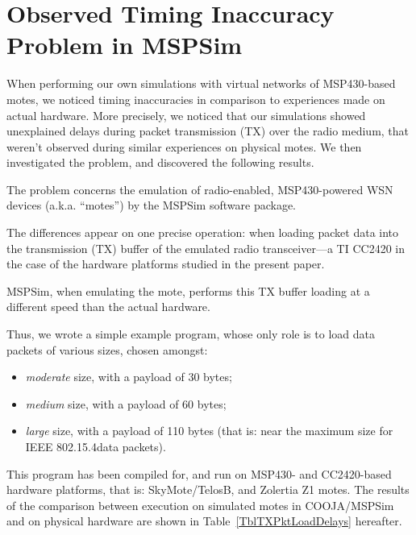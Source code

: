 \documentclass[a4paper,10pt]{article}
\begin{document}

\section{Observed Timing Inaccuracy Problem in MSPSim}
\label{results}

When performing our own simulations with virtual networks of MSP430-based
motes, we noticed timing inaccuracies in comparison to experiences made
on actual hardware. More precisely, we noticed that our simulations showed
unexplained delays during packet transmission (TX) over the radio medium,
that weren't observed during similar experiences on physical motes.
We then investigated the problem, and discovered the following results.

The problem concerns the emulation of radio-enabled, MSP430-powered WSN
devices (a.k.a. ``motes'') by the MSPSim software package.

The differences appear on one precise operation: when loading packet data
into the transmission (TX) buffer of the emulated radio transceiver---a TI
CC2420 in the case of the hardware platforms studied in the present paper.

MSPSim, when emulating the mote, performs this TX buffer loading at
a different speed than the actual hardware.

Thus, we wrote a simple example program, whose only role is to load data
packets of various sizes, chosen amongst:
\begin{itemize}
\item \emph{moderate} size, with a payload of 30 bytes;
\item \emph{medium} size, with a payload of 60 bytes;
\item \emph{large} size, with a payload of 110 bytes (that is:
      near the maximum size for IEEE 802.15.4\footnotemark[1] data packets).
\end{itemize}
This program has been compiled for, and run on MSP430- and CC2420-based
hardware platforms, that is: SkyMote/TelosB, and Zolertia Z1 motes.
The results of the comparison between execution on simulated motes
in COOJA/MSPSim and on physical hardware are shown in
Table~\ref{TblTXPktLoadDelays} hereafter.
\end{document}
